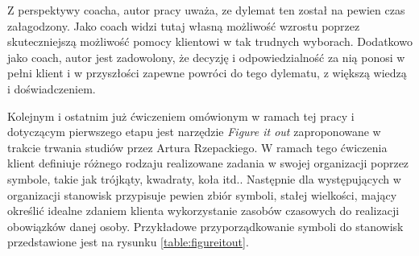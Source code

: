 Z perspektywy coacha, autor pracy uważa, ze dylemat ten został na pewien czas załagodzony. Jako coach widzi tutaj własną możliwość wzrostu poprzez
skuteczniejszą możliwość pomocy klientowi w tak trudnych wyborach. Dodatkowo jako coach, autor jest zadowolony, że decyzję i odpowiedzialność za nią
ponosi w pełni klient i w przyszłości zapewne powróci do tego dylematu, z większą wiedzą i doświadczeniem.

Kolejnym i ostatnim już ćwiczeniem omówionym w ramach tej pracy i dotyczącym pierwszego etapu jest narzędzie \emph{Figure it out} zaproponowane
w trakcie trwania studiów przez Artura Rzepackiego. W ramach tego ćwiczenia klient definiuje różnego rodzaju realizowane zadania w swojej
organizacji poprzez symbole, takie jak trójkąty, kwadraty, koła itd.. Następnie dla występujących w organizacji stanowisk przypisuje pewien
zbiór symboli, stałej wielkości, mający określić idealne zdaniem klienta wykorzystanie zasobów czasowych do realizacji obowiązków danej osoby.
Przykładowe przyporządkowanie symboli do stanowisk przedstawione jest na rysunku \ref{table:figureitout}.

